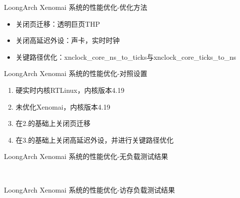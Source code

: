\documentclass{beamer}
\begin{document}
\begin{frame}{LoongArch Xenomai 系统的性能优化-优化方法}
    \begin{itemize}
        \item 关闭页迁移：透明巨页THP
        \item 关闭高延迟外设：声卡，实时时钟
        \item 关键路径优化：{\ttfamily xnclock\_core\_ns\_to\_ticks}与{\ttfamily xnclock\_core\_ticks\_to\_ns}
    \end{itemize}
\end{frame}

\begin{frame}{LoongArch Xenomai 系统的性能优化-对照设置}
    \begin{enumerate}
        \item 硬实时内核RTLinux，内核版本4.19
        \item 未优化Xenomai，内核版本4.19
        \item 在2.的基础上关闭页迁移
        \item 在3.的基础上关闭高延迟外设，并进行关键路径优化     
    \end{enumerate}
\end{frame}

\begin{frame}{LoongArch Xenomai 系统的性能优化-无负载测试结果}
    \begin{figure}[H]
        \centering  %
        \vspace{-0.35cm} %
        \subfigtopskip=2pt %
        \subfigbottomskip=2pt %
        \subfigcapskip=-5pt %
    \\
    \end{figure}
\end{frame}

\begin{frame}{LoongArch Xenomai 系统的性能优化-访存负载测试结果}
    \begin{figure}[H]
        \centering  %
        \vspace{-0.35cm} %
        \subfigtopskip=2pt %
        \subfigbottomskip=2pt %
        \subfigcapskip=-5pt %
    \\
    \end{figure}
\end{frame}
\end{document}
